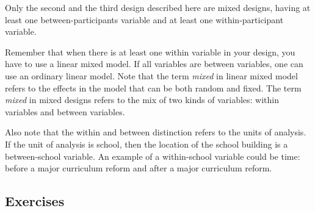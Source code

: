 \documentclass[]{report}\usepackage[]{graphicx}\usepackage[]{color}
\begin{document}
Only the second and the third design described here are mixed designs, having at least one between-participants variable and at least one within-participant variable. 

Remember that when there is at least one within variable in your design, you have to use a linear mixed model. If all variables are between variables, one can use an ordinary linear model. Note that the term \textit{mixed} in linear mixed model refers to the effects in the model that can be both random and fixed. The term \textit{mixed} in mixed designs refers to the mix of two kinds of variables: within variables and between variables. 

Also note that the within and between distinction refers to the units of analysis. If the unit of analysis is school, then the location of the school building is a between-school variable. An example of a within-school variable could be time: before a major curriculum reform and after a major curriculum reform. 

\subsection{Exercises}
\end{document}
